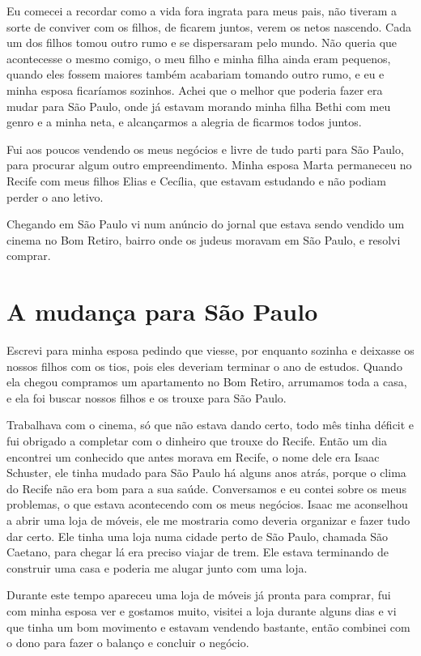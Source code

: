 Eu comecei a recordar como a vida fora ingrata para meus pais, não
tiveram a sorte de conviver com os filhos, de ficarem juntos, verem os
netos nascendo. Cada um dos filhos tomou outro rumo e se dispersaram
pelo mundo. Não queria que acontecesse o mesmo comigo, o meu filho e
minha filha ainda eram pequenos, quando eles fossem maiores também
acabariam tomando outro rumo, e eu e minha esposa ficaríamos sozinhos.
Achei que o melhor que poderia fazer era mudar para São Paulo, onde já
estavam morando minha filha Bethi com meu genro e a minha neta, e
alcançarmos a alegria de ficarmos todos juntos.

Fui aos poucos vendendo os meus negócios e livre de tudo parti para São
Paulo, para procurar algum outro empreendimento. Minha esposa Marta
permaneceu no Recife com meus filhos Elias e Cecília, que estavam
estudando e não podiam perder o ano letivo.

Chegando em São Paulo vi num anúncio do jornal que estava sendo vendido
um cinema no Bom Retiro, bairro onde os judeus moravam em São Paulo, e
resolvi comprar.

\chapter{A mudança para São Paulo}

Escrevi para minha esposa pedindo que viesse, por enquanto sozinha e
deixasse os nossos filhos com os tios, pois eles deveriam terminar o ano
de estudos. Quando ela chegou compramos um apartamento no Bom Retiro,
arrumamos toda a casa, e ela foi buscar nossos filhos e os trouxe para
São Paulo.

Trabalhava com o cinema, só que não estava dando certo, todo mês tinha
déficit e fui obrigado a completar com o dinheiro que trouxe do Recife.
Então um dia encontrei um conhecido que antes morava em Recife, o nome
dele era Isaac Schuster, ele tinha mudado para São Paulo há alguns anos
atrás, porque o clima do Recife não era bom para a sua saúde.
Conversamos e eu contei sobre os meus problemas, o que estava
acontecendo com os meus negócios. Isaac me aconselhou a abrir uma loja
de móveis, ele me mostraria como deveria organizar e fazer tudo dar
certo. Ele tinha uma loja numa cidade perto de São Paulo, chamada São
Caetano, para chegar lá era preciso viajar de trem. Ele estava
terminando de construir uma casa e poderia me alugar junto com uma loja.

Durante este tempo apareceu uma loja de móveis já pronta para comprar,
fui com minha esposa ver e gostamos muito, visitei a loja durante alguns
dias e vi que tinha um bom movimento e estavam vendendo bastante, então
combinei com o dono para fazer o balanço e concluir o negócio.

